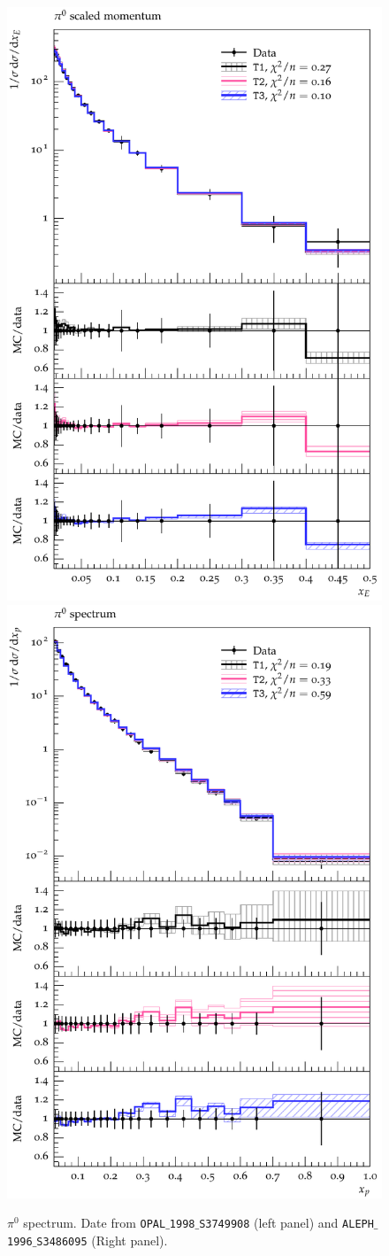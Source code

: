 \documentclass[aps,preprint,floatfix,nofootinbib,showpacs]{revtex4-1}
\begin{document}
\begin{figure}[!t]
 \centering
 \includegraphics[width=0.47\linewidth]{New Figures/OPAL_1998_S3749908/d04-x01-y01.pdf}
 \hfill
 \includegraphics[width=0.47\linewidth]{New Figures/ALEPH_1996_S3486095/d29-x01-y01.pdf}
  \caption{$\pi^0$ spectrum. Date from \texttt{OPAL$\_$1998$\_$S3749908} \cite{Ackerstaff:1998ap} (left panel) and \texttt{ALEPH$\_$1996$\_$S3486095} \cite{Barate:1996fi} (Right panel).}
 \label{Fig.2}
\end{figure}
\end{document}
